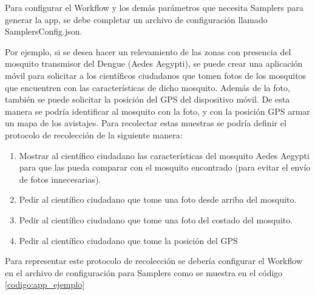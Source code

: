 Para configurar el Workflow y los demás parámetros que necesita Samplers para generar la app, se debe completar un archivo de configuración llamado SamplersConfig.json.

Por ejemplo, si se desea hacer un relevamiento de las zonas con presencia del mosquito transmisor del Dengue (Aedes Aegypti), se puede crear una aplicación móvil para solicitar a los científicos ciudadanos que tomen fotos de los mosquitos que encuentren con las características de dicho mosquito. Además de la foto, también se puede solicitar la posición del GPS del dispositivo móvil. De esta manera se podría identificar al mosquito con la foto, y con la posición GPS armar un mapa de los avistajes. Para recolectar estas muestras se podría definir el protocolo de recolección de la siguiente manera:

\begin{enumerate}

\item Mostrar al científico ciudadano las características del mosquito Aedes Aegypti para que las pueda comparar con el mosquito encontrado (para evitar el envío de fotos innecesarias).

\item Pedir al científico ciudadano que tome una foto desde arriba del mosquito.

\item Pedir al científico ciudadano que tome una foto del costado del mosquito.

\item Pedir al científico ciudadano que tome la posición del GPS

\end{enumerate}

Para representar este protocolo de recolección se debería configurar el Workflow en el archivo de configuración para Samplers como se muestra en el código \ref{codigo:app_ejemplo} 

